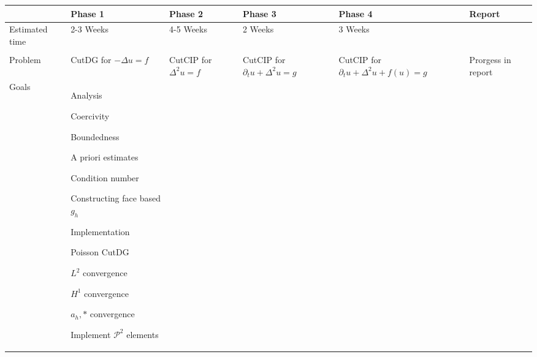 \documentclass[landscape,a4paper]{article}
\newcommand{\cmark}{\ding{51}}%
\newcommand{\done}{\rlap{$\square$}{\raisebox{2pt}{\footnotesize \hspace{1pt}\cmark}}%
\hspace{-2.5pt}}
\begin{document}
\begin{table}[htpb]
    \centering
    \footnotesize
    \begin{tabular}{|p{}|p{}|p{}|p{}|p{}|p{}|}
    \hline & \textbf{ Phase 1}       & \textbf{Phase 2} & \textbf{Phase 3}& \textbf{Phase 4} & \textbf{Report}  \\
    \hline Estimated time & 2-3 Weeks & 4-5 Weeks & 2 Weeks & 3 Weeks &  \\
    \hline &&&&& \\[-1em] %
         Problem & CutDG for $ -\Delta u = f  $
                        & CutCIP for $\Delta ^2 u = f$
                        & CutCIP for $\partial _{t} u + \Delta ^2 u =g $
                        & CutCIP for  $\partial _{t} u + \Delta ^2 u + f(u) = g $
                        & Prorgess in report  \\
        \hline Goals

        &
        \begin{itemize}[leftmargin=3mm,noitemsep]
            \item Analysis \begin{todolist}[noitemsep]
                \item[\done] Coercivity
                \item[\done] Boundedness
                \item[\done] A priori estimates
                \item[\done] Condition number
                \item[\done] Constructing face based $g_{h}$
                \end{todolist}
            \item Implementation
                \begin{todolist}[noitemsep]

                \item[\done] Poisson CutDG
                    \begin{todolist}[noitemsep]
                        \item[\done] $L^{2}$ convergence
                        \item[\done] $H^{1}$ convergence
                        \item[\done] $a_{h},*$ convergence
                        \item[\done] Implement $\mathcal{P} ^{2}$ elements
                    \end{todolist}
                \end{todolist}
        \end{itemize}


\end{tabular}
\end{table}
\end{document}

